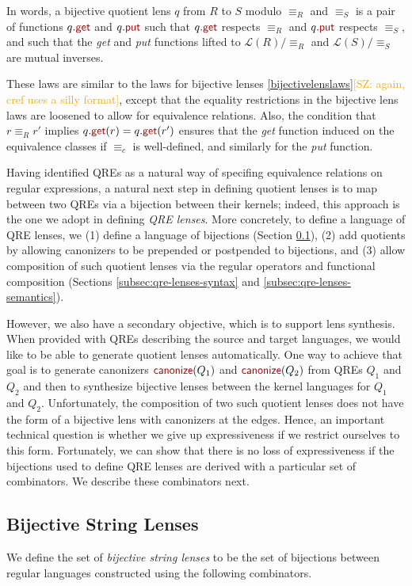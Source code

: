 \documentclass[acmsmall,review,anonymous]{acmart}
\newcommand{\FINISH}[3]{\ifdraft\textcolor{#1}{[#2: #3]}\fi}
\newcommand{\saz}[1]{\FINISH{orange}{SZ}{#1}}
\newcommand{\kw}[1]{\textcolor{dkred}{\ensuremath{\mathsf{#1}}}}
\newcommand{\canonize}{\ensuremath{\kw{canonize}}}
\newcommand{\get}{\ensuremath{\kw{get}}}
\newcommand{\lput}{\ensuremath{\kw{put}}}
\begin{document}
In words, a bijective quotient lens $q$ from $R$ to $S$ modulo $\equiv_R$
and $\equiv_S$ is a pair of functions $q.\get$ and $q.\lput$ such that
$q.\get$ respects $\equiv_R$ and $q.\lput$ respects $\equiv_S$, and such that
the {\em get} and {\em put} functions lifted to $\mathcal{L}(R)/{\equiv_R}$ and
$\mathcal{L}(S)/{\equiv_S}$ are mutual inverses.

These laws are similar to the laws for bijective lenses
\cref{bijectivelenslaws}\saz{again, cref uses a silly format}, except that the  equality restrictions in the
bijective lens laws are loosened to allow for equivalence relations. Also, the
condition that $r \equiv_R r'$ implies $q.\get(r) = q.\get(r')$ ensures that the
{\em get} function induced on the equivalence classes if $\equiv_c$ is
well-defined, and similarly for the {\em put} function. 

Having identified QREs as a natural way of specifing equivalence relations on
regular expressions, a natural next step in defining quotient lenses is to map
between two QREs via a bijection between their kernels; indeed, this approach
is the one we adopt in defining {\em QRE lenses}.
More concretely, to define a language of QRE lenses, we
(1) define a language of bijections (Section \ref{subsec:bijective-lenses}),
(2) add quotients by allowing canonizers to be prepended or postpended
to bijections, and 
(3) allow composition of such quotient lenses via the
regular operators and functional composition
(Sections \ref{subsec:qre-lenses-syntax} and \ref{subsec:qre-lenses-semantics}).

However, we also have a secondary objective, which is to support lens
synthesis. When provided with QREs describing the source and target
languages, we would like to be able to generate quotient lenses
automatically. One way to achieve that goal is to generate canonizers
$\canonize(Q_1)$ and $\canonize(Q_2)$ from QREs $Q_1$ and $Q_2$ and
then to synthesize bijective lenses between the kernel languages for
$Q_1$ and $Q_2$.
Unfortunately, the composition of two such quotient lenses does not have 
the form of a bijective lens with canonizers at the edges. Hence, an important
technical question is whether we give up expressiveness if we restrict
ourselves to this form. 
Fortunately, we can show that there is no loss of expressiveness if
the bijections used to define QRE lenses are derived with a particular
set of combinators.  We describe these combinators next.

\subsection{Bijective String Lenses}
\label{subsec:bijective-lenses}
We define the set of \textit{bijective string lenses} to be the set of
bijections between regular languages constructed using the following combinators.
\end{document}
